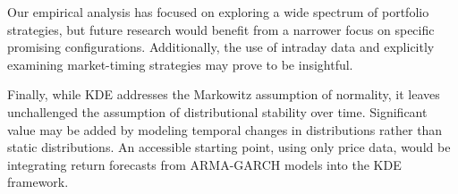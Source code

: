 Our empirical analysis has focused on exploring a wide spectrum of portfolio strategies, but future research would benefit from a narrower focus on specific promising configurations. Additionally, the use of intraday data and explicitly examining market-timing strategies may prove to be insightful.

Finally, while KDE addresses the Markowitz assumption of normality, it leaves unchallenged the assumption of distributional stability over time. Significant value may be added by modeling temporal changes in distributions rather than static distributions. An accessible starting point, using only price data, would be integrating return forecasts from ARMA-GARCH models into the KDE framework.